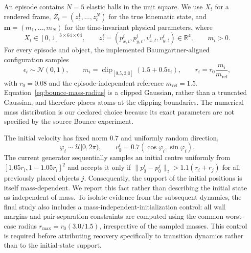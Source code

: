 An episode contains $N=5$ elastic balls in the unit square.  We use $X_t$ for a rendered
frame, $Z_t=(z_t^1,\ldots,z_t^N)$ for the true kinematic state, and
$\boldsymbol{m}=(m_1,\ldots,m_N)$ for the time-invariant physical parameters, where
\begin{equation}
    X_t\in[0,1]^{3\times64\times64},
    \qquad
    z_t^i=(p_{x,t}^i,p_{y,t}^i,v_{x,t}^i,v_{y,t}^i)\in\mathbb{R}^{4},
    \qquad
    m_i>0.
    \label{eq:bounce-observations}
\end{equation}
For every episode and object, the implemented Baumgartner-aligned configuration samples
\begin{equation}
    \epsilon_i\sim\mathcal{N}(0,1),
    \qquad
    m_i=\operatorname{clip}_{[0.5,3.0]}(1.5+0.5\epsilon_i),
    \qquad
    r_i=r_0\frac{m_i}{m_{\mathrm{ref}}},
    \label{eq:bounce-mass-radius}
\end{equation}
with $r_0=0.08$ and the episode-independent reference $m_{\mathrm{ref}}=1.5$.
Equation~\eqref{eq:bounce-mass-radius} is a clipped Gaussian, rather than a truncated
Gaussian, and therefore places atoms at the clipping boundaries.  The numerical mass
distribution is our declared choice because its exact parameters are not specified by the
source Bounce experiment.

The initial velocity has fixed norm $0.7$ and uniformly random direction,
\begin{equation}
    \varphi_i\sim\mathcal{U}[0,2\pi),
    \qquad
    v_0^i=0.7(\cos\varphi_i,\sin\varphi_i).
\end{equation}
The current generator sequentially samples an initial centre uniformly from
$[1.05r_i,1-1.05r_i]^2$ and accepts it only if
$\lVert p_0^i-p_0^j\rVert_2>1.1(r_i+r_j)$ for all previously placed objects $j$.
Consequently, the support of the initial positions is itself mass-dependent.  We report this
fact rather than describing the initial state as independent of mass.  To isolate evidence from
the subsequent dynamics, the final study also includes a mass-independent-initialization
control: all wall margins and pair-separation constraints are computed using the common
worst-case radius $r_{\max}=r_0(3.0/1.5)$, irrespective of the sampled masses.  This control is
required before attributing recovery specifically to transition dynamics rather than to the
initial-state support.

